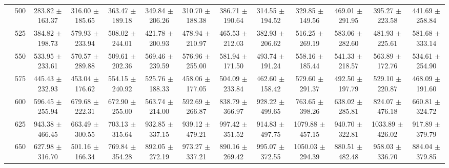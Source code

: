 \begin{table}[h]
{\begin{tabular}{
        ccccccccccccc}
 & 500& 283.82 $\pm$ 163.37& 316.00 $\pm$ 185.65& 363.47 $\pm$ 189.18& 349.84 $\pm$ 206.26& 310.70 $\pm$ 188.38& 386.71 $\pm$ 190.64& 314.55 $\pm$ 194.52& 329.85 $\pm$ 149.56& 469.01 $\pm$ 291.95& 395.27 $\pm$ 223.58& 441.69 $\pm$ 258.84 \\ 
 & 525& 384.82 $\pm$ 198.73& 579.93 $\pm$ 233.94& 508.02 $\pm$ 244.01& 421.78 $\pm$ 200.93& 478.94 $\pm$ 210.97& 465.53 $\pm$ 212.03& 382.93 $\pm$ 206.62& 516.25 $\pm$ 269.19& 583.06 $\pm$ 282.60& 481.93 $\pm$ 225.61& 581.68 $\pm$ 333.14 \\ 
 & 550& 533.95 $\pm$ 233.61& 570.57 $\pm$ 289.88& 509.61 $\pm$ 202.36& 569.46 $\pm$ 239.59& 576.96 $\pm$ 255.00& 581.94 $\pm$ 171.50& 493.74 $\pm$ 191.24& 558.16 $\pm$ 185.44& 541.33 $\pm$ 218.57& 563.89 $\pm$ 172.76& 534.61 $\pm$ 254.90 \\ 
 & 575& 445.43 $\pm$ 232.93& 453.04 $\pm$ 176.62& 554.15 $\pm$ 240.92& 525.76 $\pm$ 188.33& 458.06 $\pm$ 177.05& 504.09 $\pm$ 233.84& 462.60 $\pm$ 158.42& 579.60 $\pm$ 291.37& 492.50 $\pm$ 197.79& 529.10 $\pm$ 220.87& 468.09 $\pm$ 191.60 \\ 
 & 600& 596.45 $\pm$ 255.94& 679.68 $\pm$ 222.31& 672.90 $\pm$ 255.00& 563.74 $\pm$ 214.00& 592.69 $\pm$ 266.87& 838.79 $\pm$ 366.97& 928.22 $\pm$ 499.65& 763.65 $\pm$ 398.26& 638.02 $\pm$ 285.81& 824.07 $\pm$ 476.18& 660.81 $\pm$ 324.72 \\ 
 & 625& 943.38 $\pm$ 466.45& 663.49 $\pm$ 300.55& 703.13 $\pm$ 315.64& 932.85 $\pm$ 337.15& 939.12 $\pm$ 479.21& 997.42 $\pm$ 351.52& 914.83 $\pm$ 497.75& 1079.88 $\pm$ 457.15& 940.70 $\pm$ 322.81& 1033.89 $\pm$ 426.02& 917.89 $\pm$ 379.79 \\ 
 & 650& 627.98 $\pm$ 316.70& 501.16 $\pm$ 166.34& 769.84 $\pm$ 354.28& 892.05 $\pm$ 272.19& 973.27 $\pm$ 337.21& 890.16 $\pm$ 269.42& 995.07 $\pm$ 372.55& 1050.03 $\pm$ 294.39& 880.51 $\pm$ 482.48& 958.03 $\pm$ 336.70& 884.04 $\pm$ 379.85 \\ \hline 

        \end{tabular}%
        }

        \end{table}
        
